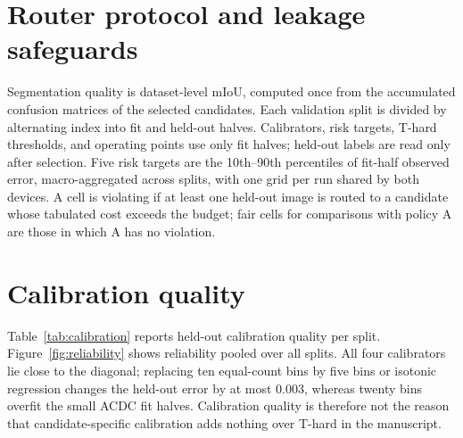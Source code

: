 \documentclass[a4paper,review,12pt]{elsarticle}
\newcommand{\miou}{mIoU}
\begin{document}
\begin{table}[H]
\centering
\caption{Compiled minus PyTorch \miou{} (points) per capacity and split, and the minimum pixel agreement over splits (Run A, held-out halves).}
\label{tab:compiled}
\scriptsize
\setlength{\tabcolsep}{4pt}

\end{table}

\section{Router protocol and leakage safeguards}

Segmentation quality is dataset-level \miou{}, computed once from the accumulated confusion matrices of the selected candidates. Each validation split is divided by alternating index into fit and held-out halves. Calibrators, risk targets, T-hard thresholds, and operating points use only fit halves; held-out labels are read only after selection. Five risk targets are the 10th--90th percentiles of fit-half observed error, macro-aggregated across splits, with one grid per run shared by both devices. A cell is violating if at least one held-out image is routed to a candidate whose tabulated cost exceeds the budget; fair cells for comparisons with policy A are those in which A has no violation.

\section{Calibration quality}

Table~\ref{tab:calibration} reports held-out calibration quality per split. Figure~\ref{fig:reliability} shows reliability pooled over all splits. All four calibrators lie close to the diagonal; replacing ten equal-count bins by five bins or isotonic regression changes the held-out error by at most 0.003, whereas twenty bins overfit the small ACDC fit halves. Calibration quality is therefore not the reason that candidate-specific calibration adds nothing over T-hard in the manuscript.
\end{document}
